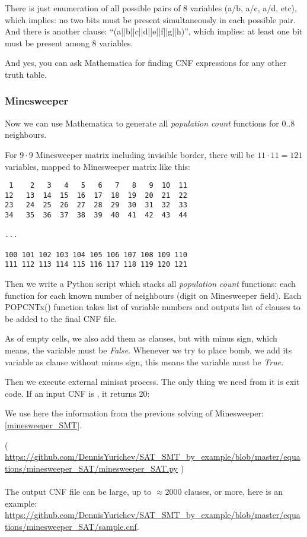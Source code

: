 There is just enumeration of all possible pairs of 8 variables (a/b, a/c, a/d, etc), which implies:
no two bits must be present simultaneously in each possible pair.
And there is another clause: ``(a||b||c||d||e||f||g||h)'', which implies:
at least one bit must be present among 8 variables.

And yes, you can ask Mathematica for finding \ac{CNF} expressions for any other truth table.

\subsubsection{Minesweeper}

Now we can use Mathematica to generate all \emph{population count} functions for 0..8 neighbours.

For $9 \cdot 9$ Minesweeper matrix including invisible border, there will be $11 \cdot 11=121$ variables,
mapped to Minesweeper matrix like this:

\begin{lstlisting}
 1    2   3   4   5   6   7   8   9  10  11
12   13  14  15  16  17  18  19  20  21  22
23   24  25  26  27  28  29  30  31  32  33
34   35  36  37  38  39  40  41  42  43  44

...

100 101 102 103 104 105 106 107 108 109 110
111 112 113 114 115 116 117 118 119 120 121
\end{lstlisting}

Then we write a Python script which stacks all \emph{population count} functions:
each function for each known number of neighbours (digit on Minesweeper field).
Each POPCNTx() function takes list of variable numbers and outputs list of clauses to be added to the final \ac{CNF} file.

As of empty cells, we also add them as clauses, but with minus sign, which means, the variable must be \emph{False}.
Whenever we try to place bomb, we add its variable as clause without minus sign, this means the variable must be \emph{True}.

Then we execute external minisat process.
The only thing we need from it is exit code.
If an input \ac{CNF} is , it returns 20:

We use here the information from the previous solving of Minesweeper: \ref{minesweeper_SMT}.



( \url{https://github.com/DennisYurichev/SAT_SMT_by_example/blob/master/equations/minesweeper_SAT/minesweeper_SAT.py} ) \\
\\
The output \ac{CNF} file can be large, up to $\approx 2000$ clauses, or more, here is an example:
\url{https://github.com/DennisYurichev/SAT_SMT_by_example/blob/master/equations/minesweeper_SAT/sample.cnf}.

